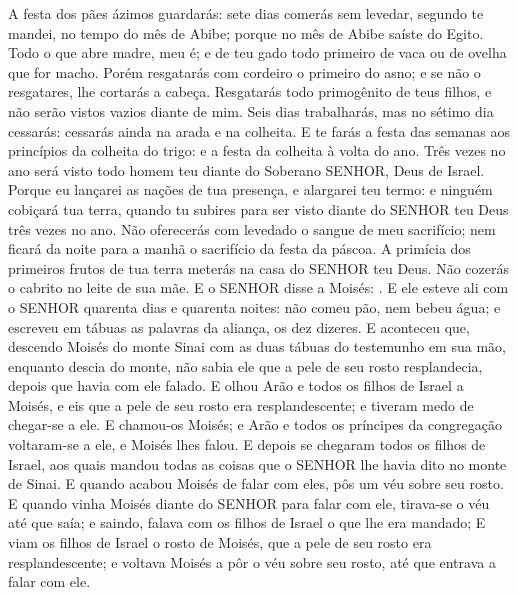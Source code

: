 {{  A festa dos pães ázimos guardarás: sete dias comerás sem levedar, segundo te mandei, no tempo do mês de Abibe; porque no mês de Abibe saíste do Egito.
  Todo o que abre madre, meu é; e de teu gado todo primeiro de vaca ou de ovelha que for macho.
  Porém resgatarás com cordeiro o primeiro do asno; e se não o resgatares, lhe cortarás a cabeça. Resgatarás todo primogênito de teus filhos, e não serão vistos vazios diante de mim.
  Seis dias trabalharás, mas no sétimo dia cessarás: cessarás ainda na arada e na colheita.
  E te farás a festa das semanas aos princípios da colheita do trigo: e a festa da colheita à volta do ano.
  Três vezes no ano será visto todo homem teu diante do Soberano SENHOR, Deus de Israel.
  Porque eu lançarei as nações de tua presença, e alargarei teu termo: e ninguém cobiçará tua terra, quando tu subires para ser visto diante do SENHOR teu Deus três vezes no ano.
  Não oferecerás com levedado o sangue de meu sacrifício; nem ficará da noite para a manhã o sacrifício da festa da páscoa.
  A primícia dos primeiros frutos de tua terra meterás na casa do SENHOR teu Deus. Não cozerás o cabrito no leite de sua mãe}.
  E o SENHOR disse a Moisés: .
  E ele esteve ali com o SENHOR quarenta dias e quarenta noites: não comeu pão, nem bebeu água; e escreveu em tábuas as palavras da aliança, os dez dizeres.
  E aconteceu que, descendo Moisés do monte Sinai com as duas tábuas do testemunho em sua mão, enquanto descia do monte, não sabia ele que a pele de seu rosto resplandecia, depois que havia com ele falado.
  E olhou Arão e todos os filhos de Israel a Moisés, e eis que a pele de seu rosto era resplandescente; e tiveram medo de chegar-se a ele.
  E chamou-os Moisés; e Arão e todos os príncipes da congregação voltaram-se a ele, e Moisés lhes falou.
  E depois se chegaram todos os filhos de Israel, aos quais mandou todas as coisas que o SENHOR lhe havia dito no monte de Sinai.
  E quando acabou Moisés de falar com eles, pôs um véu sobre seu rosto.
  E quando vinha Moisés diante do SENHOR para falar com ele, tirava-se o véu até que saía; e saindo, falava com os filhos de Israel o que lhe era mandado;
  E viam os filhos de Israel o rosto de Moisés, que a pele de seu rosto era resplandescente; e voltava Moisés a pôr o véu sobre seu rosto, até que entrava a falar com ele.
\par }

